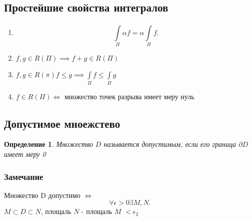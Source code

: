 \documentclass[14pt]{extarticle} \usepackage{fontspec}
\newtheorem{definition}{Определение}
\begin{document}
\subsection{Простейшие свойства интегралов}
\begin{enumerate}
    \item 
        \[
\int\limits_{\Pi}^{}  \alpha f = \alpha \int\limits_{\Pi}^{} f  
        .\] 
    \item $f,g \in R(\Pi) \implies f + g \in R(\Pi)$
    \item
         $f,g \in R(\pi) f \le  g \implies \int\limits_{\Pi}^{} f \le  \int\limits_{\Pi}^{} g   $
    \item $f \in R(\Pi) \iff$ множество точек разрыва имеет меру нуль
\end{enumerate}
\subsection{Допустимое мноежстево}
\begin{definition}
    Множество $D$ называется допустимым, если его граница  $\partial D$ имеет меру 0
\end{definition}
\subsubsection{Замечание}
Множество D допустимо $\iff$ 
 \[
\forall  \epsilon > 0 \exists M, N
.\]
$M \subset D \subset N$,  площаль  $N$ - площаль  $M$  $< \epsilon_2 $
\end{document}
